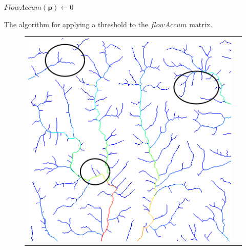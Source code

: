 
\begin{algorithm}[t]
\begin{algorithmic}
      \STATE $FlowAccum( \textbf{p} ) \gets 0$
    \ENDIF
  \ENDFOR
\end{algorithmic}
\caption[The algorithm for applying a threshold to the $flowAccum$ matrix.]{\label{algorithm:ThresholdFlow}The algorithm for applying a threshold to the $flowAccum$ matrix.}
\end{algorithm}

\begin{figure}[t]
\centering
\begin{tabular}{c|c}
\begin{minipage}[b]{0.45\linewidth}
\begin{center}
\includegraphics[width=\linewidth]{images/2DWithoutThresholdWeighting_mtn3_annotated.png}
\end{center}
\end{minipage}
&
\begin{minipage}[b]{0.45\linewidth}
\begin{center}

\end{center}
\end{minipage}
\end{tabular}
\end{figure}
